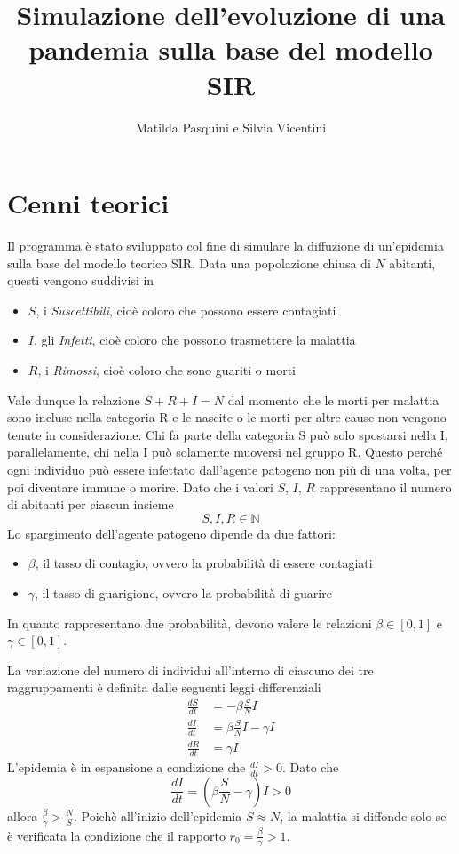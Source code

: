 \documentclass[11pt, a4paper, left=3.5cm, right=3.5cm]{article}
\title{Simulazione dell'evoluzione di una pandemia sulla base del modello SIR}
\author{Matilda Pasquini e Silvia Vicentini}
\begin{document}
\maketitle

\section{Cenni teorici}
Il programma \`{e} stato sviluppato col fine di simulare la diffuzione di 
un'epidemia sulla base del modello teorico SIR. Data una popolazione chiusa di 
$N$ abitanti, questi vengono suddivisi in
\begin{itemize}
\item $S$, i \textit{Suscettibili}, cio\`{e} coloro che possono essere contagiati
\item $I$, gli \textit{Infetti}, cio\`{e} coloro che possono trasmettere la malattia
\item $R$, i \textit{Rimossi}, cio\`{e} coloro che sono guariti o morti
\end{itemize}
Vale dunque la relazione $S+R+I=N$ dal momento che le morti per malattia sono 
incluse nella categoria R e le nascite o le morti per altre cause non vengono 
tenute in considerazione. Chi fa parte della categoria S pu\`{o} solo spostarsi 
nella I, parallelamente, chi nella I pu\`{o} solamente muoversi nel gruppo R. 
Questo perch\'e ogni individuo pu\`{o} essere infettato dall'agente patogeno 
non pi\`{u} di una volta, per poi diventare immune o morire. Dato che i valori 
$S$, $I$, $R$ rappresentano il numero di abitanti per ciascun insieme 
\[S, I, R \in \mathbb{N}\]
Lo spargimento dell'agente patogeno dipende da due fattori:
\begin{itemize}
\item \textit{$\beta$}, il tasso di contagio, ovvero la probabilit\`{a} di
essere contagiati
\item \textit{$\gamma$}, il tasso di guarigione, ovvero la probabilit\`{a} di 
guarire
\end{itemize}
In quanto rappresentano due probabilit\`{a}, devono valere le relazioni $\beta \in [0, 1]$ e $\gamma \in [0, 1]$.

La variazione del numero di individui all'interno di ciascuno dei tre 
raggruppamenti \`{e} definita dalle seguenti leggi differenziali
\begin{align*} 
\frac{dS}{dt} &= -\beta\frac{S}{N}I  \\
\frac{dI}{dt} &= \beta\frac{S}{N}I-\gamma I \\
\frac{dR}{dt} &= \gamma I 
\end{align*}
L'epidemia \`{e} in espansione a condizione che $\frac{dI}{dt} > 0$. 
Dato che \[\frac{dI}{dt}=(\beta\frac{S}{N}-\gamma) I>0\] 
allora $\frac{\beta}{\gamma}>\frac{N}{S}$. Poich\`{e} all'inizio dell'epidemia 
$S\approx N$, la malattia si diffonde solo se \`{e} verificata la condizione 
che il rapporto $r_0=\frac{\beta}{\gamma}>1$. \\
\end{document}
